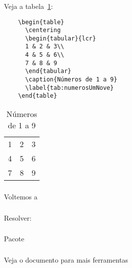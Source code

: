\begin{frame}[fragile]
  \frametitle{}
  \Large
  Veja a tabela~\ref{tab:numerosUmNove}:

  \begin{minipage}{.65\textwidth}
    \begin{verbatim}
    \begin{table}
      \centering
      \begin{tabular}{lcr}
      1 & 2 & 3\\
      4 & 5 & 6\\
      7 & 8 & 9
      \end{tabular}
      \caption{Números de 1 a 9}
      \label{tab:numerosUmNove}
    \end{table}
    \end{verbatim}
  \end{minipage}
  \hspace{.05\textwidth}
  \begin{minipage}{.25\textwidth}
    \begin{table}
      \centering
      \begin{tabular}{lcr}
        1 & 2 & 3\\
        4 & 5 & 6\\
        7 & 8 & 9
      \end{tabular}
      \caption{Números de 1 a 9}
      \label{tab:numerosUmNove}
    \end{table}
  \end{minipage}
\end{frame}

\begin{frame}
  \frametitle{}
  \Huge
  Voltemos a 
\end{frame}

\begin{frame}
  \frametitle{}
  \Huge
  Resolver: 
\end{frame}

\begin{frame}
  \frametitle{}
  \Huge
  Pacote 
\end{frame}

\begin{frame}
  \frametitle{}
  \Huge
  Veja o documento  para mais ferramentas
\end{frame}

